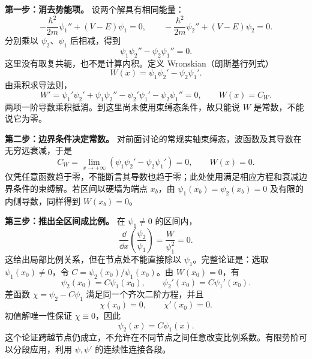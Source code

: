 \textbf{第一步：消去势能项。}
设两个解具有相同能量：
\begin{equation}
  -\frac{\hbar^2}{2m}\psi_1''+(V-E)\psi_1=0,
  \qquad
  -\frac{\hbar^2}{2m}\psi_2''+(V-E)\psi_2=0.
\end{equation}
分别乘以 $\psi_2$、$\psi_1$ 后相减，得到
\begin{equation}
  \psi_1\psi_2''-\psi_2\psi_1''=0.
\end{equation}
这里没有取复共轭，也不是计算内积。定义 Wronskian（朗斯基行列式）
\begin{equation}
  W(x)=\psi_1\psi_2'-\psi_2\psi_1'.
  \label{eq:QM-C05-S06-wronskian}
\end{equation}
由乘积求导法则，
\begin{equation}
  W'=\psi_1'\psi_2'+\psi_1\psi_2''
      -\psi_2'\psi_1'-\psi_2\psi_1''=0,
  \qquad W(x)=C_W.
  \label{eq:QM-C05-S06-constant-wronskian}
\end{equation}
两项一阶导数乘积抵消。到这里尚未使用束缚态条件，故只能说 $W$ 是常数，不能说它为零。

\textbf{第二步：边界条件决定常数。}
对前面讨论的常规实轴束缚态，波函数及其导数在无穷远衰减，于是
\begin{equation}
  C_W=\lim_{x\to+\infty}
    (\psi_1\psi_2'-\psi_2\psi_1')=0,
  \qquad \boxed{W(x)=0}.
\end{equation}
仅凭任意函数趋于零，不能断言其导数也趋于零；此处使用满足相应方程和衰减边界条件的束缚解。若区间以硬墙为端点 $x_b$，由 $\psi_1(x_b)=\psi_2(x_b)=0$ 及有限的内侧导数，同样得到 $W(x_b)=0$。

\textbf{第三步：推出全区间成比例。}
在 $\psi_1\ne0$ 的区间内，
\begin{equation}
  \frac{\dd}{\dd x}\left(\frac{\psi_2}{\psi_1}\right)
  =\frac{W}{\psi_1^2}=0.
\end{equation}
这给出局部比例关系，但在节点处不能直接除以 $\psi_1$。完整论证是：选取 $\psi_1(x_0)\ne0$，令 $C=\psi_2(x_0)/\psi_1(x_0)$。由 $W(x_0)=0$，有
\begin{equation}
  \psi_2(x_0)=C\psi_1(x_0),\qquad
  \psi_2'(x_0)=C\psi_1'(x_0).
\end{equation}
差函数 $\chi=\psi_2-C\psi_1$ 满足同一个齐次二阶方程，并且
\begin{equation}
  \chi(x_0)=0,\qquad \chi'(x_0)=0.
\end{equation}
初值解唯一性保证 $\chi\equiv0$，因此
\begin{equation}
  \boxed{\psi_2(x)=C\psi_1(x)}.
  \label{eq:QM-C05-S06-nondegeneracy}
\end{equation}
这个论证跨越节点仍成立，不允许在不同节点之间任意改变比例系数。有限势阶可以分段应用，利用 $\psi,\psi'$ 的连续性连接各段。

